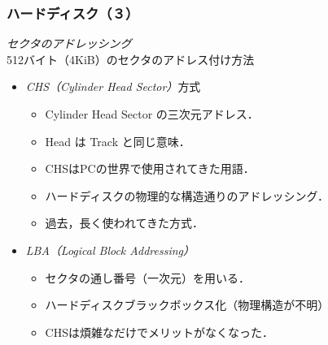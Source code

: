 \documentclass[unicode]{beamer}                   %
\begin{document}
\begin{frame}
  \frametitle{ハードディスク（３）}
  \emph{セクタのアドレッシング}\\
  512バイト（4KiB）のセクタのアドレス付け方法
  \vfill
  \begin{itemize}
  \item \emph{CHS（Cylinder Head Sector）}方式
    \begin{itemize}
    \item Cylinder Head Sector の三次元アドレス．
    \item Head は Track と同じ意味．
    \item CHSはPCの世界で使用されてきた用語．
    \item ハードディスクの物理的な構造通りのアドレッシング．
    \item 過去，長く使われてきた方式．
  \end{itemize}
  \vfill
  \item \emph{LBA（Logical Block Addressing）}
    \begin{itemize}
    \item セクタの通し番号（一次元）を用いる．
    \item ハードディスクブラックボックス化（物理構造が不明）
    \item CHSは煩雑なだけでメリットがなくなった．
    \end{itemize}
  \end{itemize}
  \vfill
\end{frame}
\end{document}
